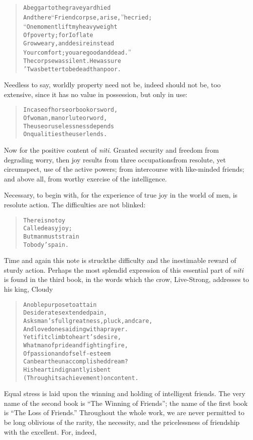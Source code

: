 \documentclass[article, twoside, 10pt]{memoir}
\renewenvironment{verbatim}{%
\begin{quote}%
\vskip -10pt%
\begin{alltt}\normalfont\small}{\end{alltt}%
\end{quote}%
\vskip -10pt
} %
\begin{document}
\begin{verbatim}
A beggar to the graveyard hied
And there “Friend corpse, arise,” he cried;
“One moment lift my heavy weight
Of poverty; for I of late
Grow weary, and desire instead
Your comfort; you are good and dead.”
The corpse was silent. He was sure
'Twas better to be dead than poor.
\end{verbatim}
Needless to say, worldly property need not be, indeed should not
be, too extensive, since it has no value in possession, but only in
use:

\begin{verbatim}
In case of horse or book or sword,
Of woman, man or lute or word,
The use or uselessness depends
On qualities the user lends.
\end{verbatim}
Now for the positive content of \emph{niti}. Granted security and
freedom from degrading worry, then joy results from three
occupations{\textemdash}from resolute, yet circumspect, use of the active
powers; from intercourse with like-minded friends; and above all,
from worthy exercise of the intelligence.

Necessary, to begin with, for the experience of true joy in the
world of men, is resolute action. The difficulties are not
blinked:

\begin{verbatim}
There is no toy
Called easy joy;
But man must strain
To body's pain.
\end{verbatim}
Time and again this note is struck{\textemdash}the difficulty and the
inestimable reward of sturdy action. Perhaps the most splendid
expression of this essential part of \emph{niti} is found in the
third book, in the words which the crow, Live-Strong, addresses to
his king, Cloudy

\begin{verbatim}
A noble purpose to attain
Desiderates extended pain,
Asks man's full greatness, pluck, and care,
And loved ones aiding with a prayer.
Yet if it climb to heart's desire,
What man of pride and fighting fire,
Of passion and of self-esteem
Can bear the unaccomplished dream?
His heart indignantly is bent
(Through its achievement) on content.
\end{verbatim}
Equal stress is laid upon the winning and holding of intelligent
friends. The very name of the second book is
``The Winning of Friends''; the name of the first book is
``The Loss of Friends.'' Throughout the whole work, we are never
permitted to be long oblivious of the rarity, the necessity, and
the pricelessness of friendship with the excellent. For, indeed,
\end{document}
